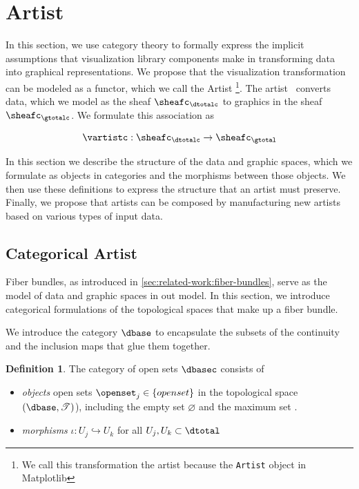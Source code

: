 \documentclass[10pt,journal,compsoc]{IEEEtran}
\theoremstyle{definition}
\newtheorem{definition}{Definition}[section]
\theoremstyle{remark}
\begin{document}
\section{Artist} 
In this section, we use category theory to formally express the implicit assumptions that visualization library components make in transforming data into graphical representations. We propose that the visualization transformation can be modeled as a functor, which we call the \textcolor{artist}{Artist} \vartist \footnote{We call this transformation the artist because the \texttt{Artist} object in Matplotlib\cite{hunterMatplotlib2DGraphics2007}}. The artist \vartist\ converts data, which we model as the sheaf $\sheafc_{\dtotalc}$ to graphics in the sheaf $\sheafc_{\gtotalc}$. We formulate this association as 

\begin{equation}
  \label{eq:artist:artist}
  \vartistc: \sheafc_{\dtotalc} \rightarrow \sheafc_{\gtotal}
\end{equation}

In this section we describe the structure of the data and graphic spaces, which we formulate as objects in categories and the morphisms between those objects. We then use these definitions to express the structure that an artist must preserve. Finally, we propose that artists can be composed by manufacturing new artists based on various types of input data. 

\subsection{Categorical Artist}
\label{sec:artist:category}

Fiber bundles, as introduced in \autoref{sec:related-work:fiber-bundles}, serve as the model of data and graphic spaces in out model. In this section, we introduce categorical formulations of the topological spaces that make up a fiber bundle. 

We introduce the category $\mathcal{\dbase}$ to encapsulate the subsets of the continuity and the inclusion maps that glue them together. 

\begin{definition} \label{def:category:K} The category of open sets $\mathcal{\dbasec}$ consists of
  \begin{itemize}
    \item \textit{objects} open sets $\openset_{j} \in \{openset\}$ in the topological space $(\dbase, \mathscr{T})$), including the empty set $\varnothing$ and the maximum set \dbase. 
    \item \textit{morphisms} $\iota: U_{j} \hookrightarrow U_{k}$ for all  $U_j, U_k \subset \dtotal$
  \end{itemize} 
\end{definition}
\end{document}

